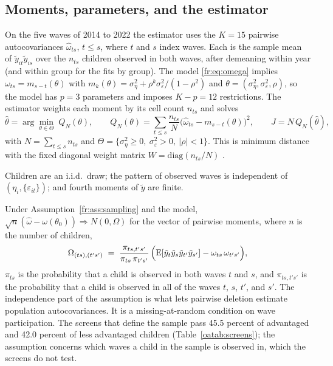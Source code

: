 \subsection{Moments, parameters, and the estimator}

On the five waves of 2014 to 2022 the estimator uses the $K = 15$ pairwise
autocovariances $\hat\omega_{ts}$, $t \le s$, where $t$ and $s$ index
waves. Each is the sample mean of $\tilde y_{it}\tilde y_{is}$ over the
$n_{ts}$ children observed in both waves, after demeaning within year
(and within group for the fits by group). The model \eqref{fr:eq:omega}
implies $\omega_{ts} = m_{s-t}(\theta)$ with
$m_k(\theta) = \sigma^2_\eta + \rho^k\sigma^2_\varepsilon/(1-\rho^2)$
and $\theta = (\sigma^2_\eta, \sigma^2_\varepsilon, \rho)$, so the model
has $p = 3$ parameters and imposes $K - p = 12$ restrictions. The
estimator weights each moment by its cell count $n_{ts}$ and solves
\begin{equation}
\hat\theta = \arg\min_{\theta \in \Theta}\; Q_N(\theta), \qquad
Q_N(\theta) = \sum_{t \le s} \frac{n_{ts}}{N}\big(\hat\omega_{ts} - m_{s-t}(\theta)\big)^2,
\qquad J = N\,Q_N(\hat\theta),
\label{fr:eq:md}
\end{equation}
with $N = \sum_{t\le s} n_{ts}$ and
$\Theta = \{\sigma^2_\eta \ge 0,\ \sigma^2_\varepsilon > 0,\ |\rho| < 1\}$.
This is minimum distance with the fixed diagonal weight matrix
$W = \mathrm{diag}(n_{ts}/N)$ \citep{Chamberlain1984, NeweyMcFadden1994}.

\begin{assumption}[Sampling]
\label{fr:ass:sampling}
Children are an i.i.d.\ draw; the pattern of observed waves is independent of $(\eta_i, \{\varepsilon_{it}\})$; and fourth moments of $\tilde y$ are
finite.
\end{assumption}

Under Assumption~\ref{fr:ass:sampling} and the model,
$\sqrt{n}(\hat\omega - \omega(\theta_0)) \Rightarrow N(0, \Omega)$
for the vector of pairwise moments, where $n$ is the number of children,
\[
\Omega_{(ts),(t's')} \;=\; \frac{\pi_{ts,t's'}}{\pi_{ts}\,\pi_{t's'}}\,
\Big(\mathrm{E}[\tilde y_t\tilde y_s\tilde y_{t'}\tilde y_{s'}] - \omega_{ts}\,\omega_{t's'}\Big),
\]
$\pi_{ts}$ is the probability that a child is observed in both waves $t$
and $s$, and $\pi_{ts,t's'}$ is the probability that a child is observed
in all of the waves $t$, $s$, $t'$, and $s'$. The independence part of the
assumption is what lets pairwise deletion estimate population
autocovariances. It is a missing-at-random condition on wave participation. The screens that define the sample pass 45.5 percent of advantaged and 42.0 percent of less advantaged children (Table~\ref{oatab:screens}); the assumption concerns which waves a child in the sample is observed in, which the screens do not test.


